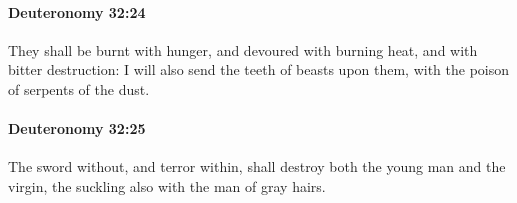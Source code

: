 		\paragraph{Deuteronomy 32:24} %
			\label{DEUTERONOMY-32-24}

			They shall be burnt with hunger, and devoured with burning heat, and with bitter destruction: I will also send the teeth of beasts upon them, with the poison of serpents of the dust.


		\paragraph{Deuteronomy 32:25} %
			\label{DEUTERONOMY-32-25}

			The sword without, and terror within, shall destroy both the young man and the virgin, the suckling also with the man of gray hairs.


